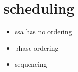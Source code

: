 \chapter*{scheduling}



\begin{itemize}
	\item ssa has no ordering
	\item phase ordering
	\item sequencing
\end{itemize}
